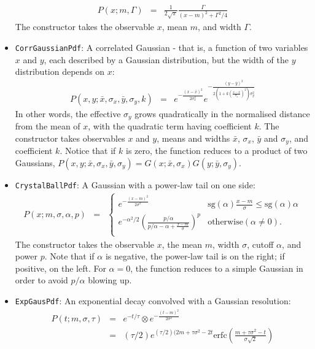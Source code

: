 \documentclass[12pt,pdflatex]{article}
\begin{document}
\begin{itemize}
\begin{eqnarray}
P(x;m,\Gamma) &=& \frac{1}{2\sqrt{\pi}}\frac{\Gamma}{(x-m)^2 + \Gamma^2/4}
\end{eqnarray}
The constructor takes the observable $x$, mean $m$, and width $\Gamma$. 
\item \texttt{CorrGaussianPdf}: A correlated Gaussian - that is, 
a function of two variables $x$ and $y$, each described by a Gaussian distribution, 
but the width of the $y$ distribution depends on $x$:
\begin{eqnarray}
P(x,y;\bar x,\sigma_x,\bar y, \sigma_y, k) &=& 
e^{-\frac{(x-\bar x)^2}{2\sigma_x^2}}e^{-\frac{(y-\bar y)^2}{2(1 + k(\frac{x-\bar x}{\sigma_x})^2)\sigma_y^2}}
\end{eqnarray}
In other words, the effective $\sigma_y$ grows quadratically
in the normalised distance from the mean of $x$, with the quadratic
term having coefficient $k$.
The constructor takes observables $x$ and $y$, means and widths $\bar x$, $\sigma_x$,
$\bar y$ and $\sigma_y$, and coefficient $k$. Notice that if $k$ is zero, 
the function reduces to a product of two Gaussians, 
$P(x,y;\bar x,\sigma_x,\bar y, \sigma_y) = G(x;\bar x, \sigma_x)G(y;\bar y, \sigma_y)$. 
\item \texttt{CrystalBallPdf}: A Gaussian with a power-law tail on one side:
\begin{eqnarray}
P(x;m,\sigma,\alpha,p) &=& \left\{ \begin{matrix}
e^{-\frac{(x-m)^2}{2\sigma^2}} & \mathrm{sg}(\alpha)\frac{x - m}{\sigma} \le \mathrm{sg}(\alpha)\alpha \\
e^{-\alpha^2/2}\left(\frac{p/\alpha}{p/\alpha - \alpha + \frac{x-m}{\sigma}}\right)^p
& \mathrm{otherwise } (\alpha\ne 0). \\
\end{matrix}
\right. 
\end{eqnarray}
The constructor takes the observable $x$, the mean $m$, width $\sigma$, cutoff $\alpha$,
and power $p$. Note that if $\alpha$ is negative, the power-law tail is on the right;
if positive, on the left. For $\alpha=0$, the function reduces to a simple Gaussian
in order to avoid $p/\alpha$ blowing up. 
\item \texttt{ExpGausPdf}: An exponential decay convolved with a Gaussian
resolution:
\begin{eqnarray}
P(t;m,\sigma,\tau) &=& e^{-t/\tau} \otimes e^{-\frac{(t-m)^2}{2\sigma^2}} \\
&=& (\tau/2)e^{(\tau/2)(2m+\tau\sigma^2-2t}\mathrm{erfc}\left(\frac{m+\tau\sigma^2-t}{\sigma\sqrt{2}}\right)
\end{eqnarray}

\end{itemize}
\end{document}
